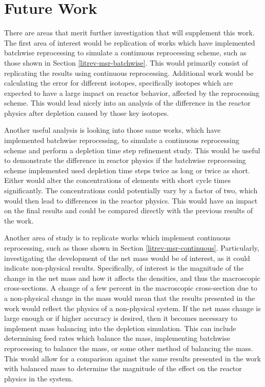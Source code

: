 \section{Future Work}

There are areas that merit further investigation that will supplement this work.
The first area of interest would be replication of works which have implemented batchwise reprocessing to simulate a continuous reprocessing scheme, such as those shown in Section \ref{litrev-msr-batchwise}.
This would primarily consist of replicating the results using continuous reprocessing.
Additional work would be calculating the error for different isotopes, specifically isotopes which are expected to have a large impact on reactor behavior, affected by the reprocessing scheme.
This would lead nicely into an analysis of the difference in the reactor physics after depletion caused by those key isotopes.

Another useful analysis is looking into those same works, which have implemented batchwise reprocessing, to simulate a continuous reprocessing scheme and perform a depletion time step refinement study.
This would be useful to demonstrate the difference in reactor physics if the batchwise reprocessing scheme implemented used depletion time steps twice as long or twice as short.
Either would alter the concentrations of elements with short cycle times significantly.
The concentrations could potentially vary by a factor of two, which would then lead to differences in the reactor physics.
This would have an impact on the final results and could be compared directly with the previous results of the work.

Another area of study is to replicate works which implement continuous reprocessing, such as those shown in Section \ref{litrev-msr-continuous}.
Particularly, investigating the development of the net mass would be of interest, as it could indicate non-physical results.
Specifically, of interest is the magnitude of the change in the net mass and how it affects the densities, and thus the macroscopic cross-sections.
A change of a few percent in the macroscopic cross-section due to a non-physical change in the mass would mean that the results presented in the work would reflect the physics of a non-physical system.
If the net mass change is large enough or if higher accuracy is desired, then it becomes necessary to implement mass balancing into the depletion simulation.
This can include determining feed rates which balance the mass, implementing batchwise reprocessing to balance the mass, or some other method of balancing the mass.
This would allow for a comparison against the same results presented in the work with balanced mass to determine the magnitude of the effect on the reactor physics in the system.

